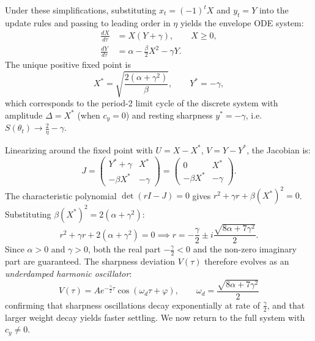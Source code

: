 \documentclass{article}
\begin{document}
Under these simplifications, substituting $x_t = (-1)^t X$ and $y_t = Y$ into the update rules and passing to leading order in $\eta$ yields the envelope ODE system:
\begin{align*}
    \frac{dX}{d\tau} &= X(Y + \gamma), \qquad X \geq 0,\\
    \frac{dY}{d\tau} &= \alpha - \frac{\beta}{2}X^2 - \gamma Y.
\end{align*}
The unique positive fixed point is
\[
    X^* = \sqrt{\frac{2(\alpha+\gamma^2)}{\beta}}, \qquad Y^* = -\gamma,
\]
which corresponds to the period-2 limit cycle of the discrete system with amplitude $\Delta = X^*$ (when $c_y = 0$) and resting sharpness $y^* = -\gamma$, i.e.\ $S(\theta_t) \to \frac{2}{\eta} - \gamma$.

Linearizing around the fixed point with $U = X - X^*$, $V = Y - Y^*$, the Jacobian is:
\[
    J = \begin{pmatrix} Y^* + \gamma & X^* \\ -\beta X^* & -\gamma \end{pmatrix}
      = \begin{pmatrix} 0 & X^* \\ -\beta X^* & -\gamma \end{pmatrix}.
\]
The characteristic polynomial $\det(rI - J) = 0$ gives $r^2 + \gamma r + \beta(X^*)^2 = 0$. Substituting $\beta(X^*)^2 = 2(\alpha + \gamma^2)$:
\[
    r^2 + \gamma r + 2(\alpha + \gamma^2) = 0
    \implies
    r = -\frac{\gamma}{2} \pm i\frac{\sqrt{8\alpha + 7\gamma^2}}{2}.
\]
Since $\alpha > 0$ and $\gamma > 0$, both the real part $-\frac{\gamma}{2} < 0$ and the non-zero imaginary part are guaranteed. The sharpness deviation $V(\tau)$ therefore evolves as an \emph{underdamped harmonic oscillator}:
\[
    V(\tau) = Ae^{-\frac{\gamma}{2}\tau}\cos(\omega_d \tau + \varphi),
    \qquad \omega_d = \frac{\sqrt{8\alpha + 7\gamma^2}}{2}
\]
confirming that sharpness oscillations decay exponentially at rate of $\frac{\gamma}{2}$, and that larger weight decay yields faster settling. We now return to the full system with $c_y \neq 0$.
\end{document}
